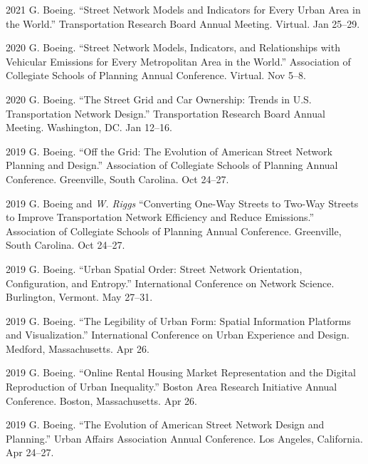 \documentclass[11pt,letterpaper]{report} %
\begin{document}
\begin{tablist}
        \item[2021] \tab{}G. Boeing. \enquote{Street Network Models and Indicators for Every Urban Area in the World.} Transportation Research Board Annual Meeting. Virtual. Jan 25--29.

        \item[2020] \tab{}G. Boeing. \enquote{Street Network Models, Indicators, and Relationships with Vehicular Emissions for Every Metropolitan Area in the World.} Association of Collegiate Schools of Planning Annual Conference. Virtual. Nov 5--8.

        \item[2020] \tab{}G. Boeing. \enquote{The Street Grid and Car Ownership: Trends in U.S. Transportation Network Design.} Transportation Research Board Annual Meeting. Washington, DC\@. Jan 12--16.

        \item[2019] \tab{}G. Boeing. \enquote{Off the Grid: The Evolution of American Street Network Planning and Design.} Association of Collegiate Schools of Planning Annual Conference. Greenville, South Carolina. Oct 24--27.

        \item[2019] \tab{}G. Boeing and \textit{W. Riggs} \enquote{Converting One-Way Streets to Two-Way Streets to Improve Transportation Network Efficiency and Reduce Emissions.} Association of Collegiate Schools of Planning Annual Conference. Greenville, South Carolina. Oct 24--27.

        \item[2019] \tab{}G. Boeing. \enquote{Urban Spatial Order: Street Network Orientation, Configuration, and Entropy.} International Conference on Network Science. Burlington, Vermont. May 27--31.

        \item[2019] \tab{}G. Boeing. \enquote{The Legibility of Urban Form: Spatial Information Platforms and Visualization.} International Conference on Urban Experience and Design. Medford, Massachusetts. Apr 26.

        \item[2019] \tab{}G. Boeing. \enquote{Online Rental Housing Market Representation and the Digital Reproduction of Urban Inequality.} Boston Area Research Initiative Annual Conference. Boston, Massachusetts. Apr 26.

        \item[2019] \tab{}G. Boeing. \enquote{The Evolution of American Street Network Design and Planning.} Urban Affairs Association Annual Conference. Los Angeles, California. Apr 24--27.


\end{tablist}
\end{document}
